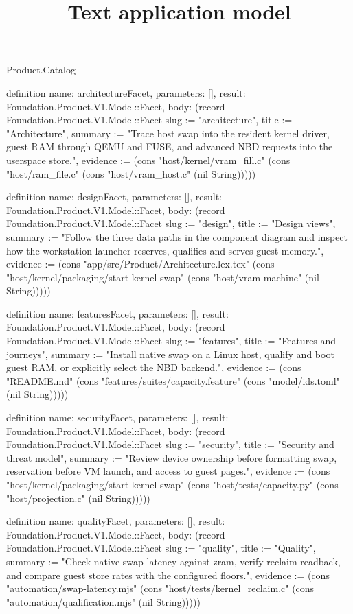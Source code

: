 \begin{lexlean}{Product.Catalog}
\title{Text application model}
\begin{semanticmodule}
definition{
  name: architectureFacet, parameters: [], result: Foundation.Product.V1.Model::Facet,
  body: (record Foundation.Product.V1.Model::Facet {slug := "architecture", title := "Architecture", summary := "Trace host swap into the resident kernel driver, guest RAM through QEMU and FUSE, and advanced NBD requests into the userspace store.", evidence := (cons "host/kernel/vram_fill.c" (cons "host/ram_file.c" (cons "host/vram_host.c" (nil String))))})
}

definition{
  name: designFacet, parameters: [], result: Foundation.Product.V1.Model::Facet,
  body: (record Foundation.Product.V1.Model::Facet {slug := "design", title := "Design views", summary := "Follow the three data paths in the component diagram and inspect how the workstation launcher reserves, qualifies and serves guest memory.", evidence := (cons "app/src/Product/Architecture.lex.tex" (cons "host/kernel/packaging/start-kernel-swap" (cons "host/vram-machine" (nil String))))})
}

definition{
  name: featuresFacet, parameters: [], result: Foundation.Product.V1.Model::Facet,
  body: (record Foundation.Product.V1.Model::Facet {slug := "features", title := "Features and journeys", summary := "Install native swap on a Linux host, qualify and boot guest RAM, or explicitly select the NBD backend.", evidence := (cons "README.md" (cons "features/suites/capacity.feature" (cons "model/ids.toml" (nil String))))})
}

definition{
  name: securityFacet, parameters: [], result: Foundation.Product.V1.Model::Facet,
  body: (record Foundation.Product.V1.Model::Facet {slug := "security", title := "Security and threat model", summary := "Review device ownership before formatting swap, reservation before VM launch, and access to guest pages.", evidence := (cons "host/kernel/packaging/start-kernel-swap" (cons "host/tests/capacity.py" (cons "host/projection.c" (nil String))))})
}

definition{
  name: qualityFacet, parameters: [], result: Foundation.Product.V1.Model::Facet,
  body: (record Foundation.Product.V1.Model::Facet {slug := "quality", title := "Quality", summary := "Check native swap latency against zram, verify reclaim readback, and compare guest store rates with the configured floors.", evidence := (cons "automation/swap-latency.mjs" (cons "host/tests/kernel_reclaim.c" (cons "automation/qualification.mjs" (nil String))))})
}


\end{semanticmodule}
\end{lexlean}
